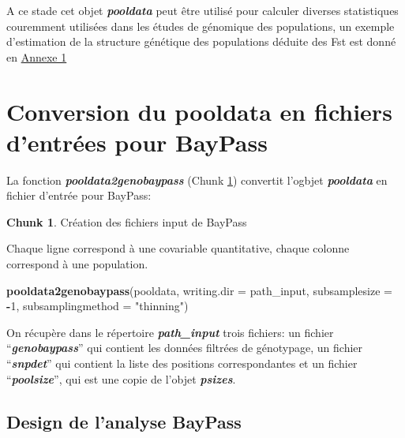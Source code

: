 \documentclass[
  openany]{book}
\newenvironment{Shaded}{\begin{snugshade}}{\end{snugshade}}
\newcommand{\AttributeTok}[1]{\textcolor[rgb]{0.13,0.29,0.53}{#1}}
\newcommand{\DecValTok}[1]{\textcolor[rgb]{0.00,0.00,0.81}{#1}}
\newcommand{\FunctionTok}[1]{\textcolor[rgb]{0.13,0.29,0.53}{\textbf{#1}}}
\newcommand{\NormalTok}[1]{#1}
\newcommand{\SpecialCharTok}[1]{\textcolor[rgb]{0.81,0.36,0.00}{\textbf{#1}}}
\newcommand{\StringTok}[1]{\textcolor[rgb]{0.31,0.60,0.02}{#1}}
\theoremstyle{definition}
\theoremstyle{definition}
\theoremstyle{definition}
\newtheorem{exercise}{Chunk}[chapter]
\theoremstyle{definition}
\theoremstyle{remark}
\begin{document}
A ce stade cet objet \textbf{\emph{pooldata}} peut être utilisé pour calculer diverses statistiques couremment utilisées dans les études de génomique des populations, un exemple d'estimation de la structure génétique des populations déduite des Fst est donné en \protect\hyperlink{An1}{Annexe 1}

\hypertarget{conversion-du-pooldata-en-fichiers-dentruxe9es-pour-baypass}{%
\chapter*{Conversion du pooldata en fichiers d'entrées pour BayPass}\label{conversion-du-pooldata-en-fichiers-dentruxe9es-pour-baypass}}

La fonction \textbf{\emph{pooldata2genobaypass}} (Chunk \ref{exr:chunk3}) convertit l'ogbjet \textbf{\emph{pooldata}} en fichier d'entrée pour BayPass:

\begin{exercise}
\protect\hypertarget{exr:chunk3}{}\label{exr:chunk3}{Création des fichiers input de BayPass}
\end{exercise}

Chaque ligne correspond à une covariable quantitative, chaque colonne correspond à une population.

\begin{Shaded}
\begin{Highlighting}[]
\FunctionTok{pooldata2genobaypass}\NormalTok{(pooldata, }\AttributeTok{writing.dir =}\NormalTok{ path\_input, }\AttributeTok{subsamplesize =} \SpecialCharTok{{-}}\DecValTok{1}\NormalTok{, }\AttributeTok{subsamplingmethod =} \StringTok{"thinning"}\NormalTok{)}
\end{Highlighting}
\end{Shaded}

On récupère dans le répertoire \textbf{\emph{path\_input}} trois fichiers: un fichier ``\textbf{\emph{genobaypass}}'' qui contient les données filtrées de génotypage, un fichier ``\textbf{\emph{snpdet}}'' qui contient la liste des positions correspondantes et un fichier ``\textbf{\emph{poolsize}}'', qui est une copie de l'objet \textbf{\emph{psizes}}.

\hypertarget{design-de-lanalyse-baypass}{%
\section*{Design de l'analyse BayPass}\label{design-de-lanalyse-baypass}}
\end{document}

